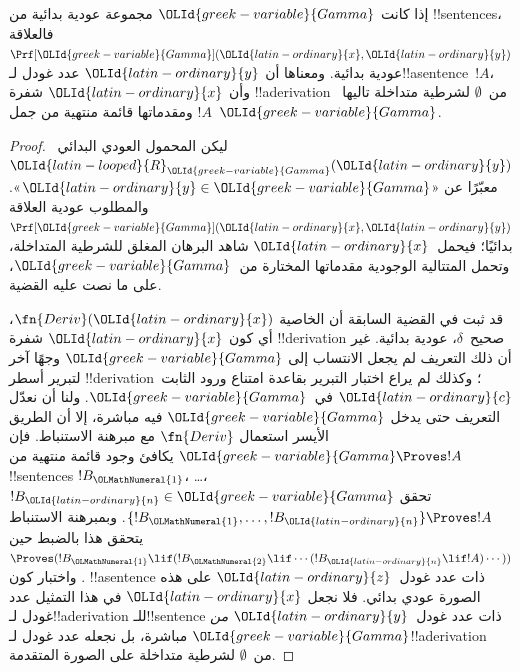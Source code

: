 \documentclass[../../../include/open-logic-section]{subfiles}
\begin{document}
\begin{prop}
إذا كانت $\OLId{greek-variable}{Gamma}$ مجموعة عودية بدائية من !!{sentence}s، فالعلاقة
$\Prf[\OLId{greek-variable}{Gamma}](\OLId{latin-ordinary}{x},\OLId{latin-ordinary}{y})$ عودية بدائية. ومعناها أن $\OLId{latin-ordinary}{y}$ عدد غودل
لـ!!a{sentence}~$!A$، وأن $\OLId{latin-ordinary}{x}$ شفرة !!a{derivation} من~$\emptyset$
لشرطية متداخلة تاليها~$!A$ ومقدماتها قائمة منتهية من جمل~$\OLId{greek-variable}{Gamma}$.
\end{prop}

\begin{proof}
ليكن المحمول العودي البدائي~$\OLId{latin-looped}{R}_\OLId{greek-variable}{Gamma}(\OLId{latin-ordinary}{y})$ معبّرًا عن
«$\OLId{latin-ordinary}{y}\in\OLId{greek-variable}{Gamma}$». والمطلوب عودية العلاقة $\Prf[\OLId{greek-variable}{Gamma}](\OLId{latin-ordinary}{x},\OLId{latin-ordinary}{y})$ بدائيًا؛
فيحمل~$\OLId{latin-ordinary}{x}$ شاهد البرهان المغلق للشرطية المتداخلة، وتحمل المتتالية
الوجودية مقدماتها المختارة من~$\OLId{greek-variable}{Gamma}$، على ما نصت عليه القضية.

قد ثبت في القضية السابقة أن الخاصية $\fn{Deriv}(\OLId{latin-ordinary}{x})$، أي كون
$\OLId{latin-ordinary}{x}$ شفرة !!{derivation} صحيح~$\delta$، عودية بدائية. غير أن ذلك
التعريف لم يجعل الانتساب إلى $\OLId{greek-variable}{Gamma}$ وجهًا آخر لتبرير أسطر
!!{derivation}؛ وكذلك لم يراع اختبار التبرير بقاعدة \QR{} امتناع ورود
الثابت~$\OLId{latin-ordinary}{c}$ في~$\OLId{greek-variable}{Gamma}$. ولنا أن نعدّل التعريف حتى يدخل
$\OLId{greek-variable}{Gamma}$ فيه مباشرة، إلا أن الطريق الأيسر استعمال
$\fn{Deriv}$ مع مبرهنة الاستنباط. فإن $\OLId{greek-variable}{Gamma}\Proves !A$ يكافئ وجود قائمة
منتهية من !!{sentence}s $!B_\OLMathNumeral{1}$، \dots، $!B_\OLId{latin-ordinary}{n}\in\OLId{greek-variable}{Gamma}$ تحقق
$\{!B_\OLMathNumeral{1},\dots,!B_\OLId{latin-ordinary}{n}\}\Proves !A$. وبمبرهنة الاستنباط يتحقق هذا بالضبط حين
$\Proves(!B_\OLMathNumeral{1}\lif(!B_\OLMathNumeral{2}\lif\cdots(!B_\OLId{latin-ordinary}{n}\lif !A)\cdots))$.
واختبار كون !!a{sentence} ذات عدد غودل~$\OLId{latin-ordinary}{z}$ على هذه الصورة عودي بدائي.
فلا نجعل $\OLId{latin-ordinary}{x}$ في هذا التمثيل عدد غودل لـ!!a{derivation}
للـ!!{sentence} ذات عدد غودل~$\OLId{latin-ordinary}{y}$ \emph{من $\OLId{greek-variable}{Gamma}$} مباشرة، بل نجعله
عدد غودل لـ!!a{derivation} من~$\emptyset$ لشرطية متداخلة على الصورة المتقدمة.


\end{proof}
\end{document}
